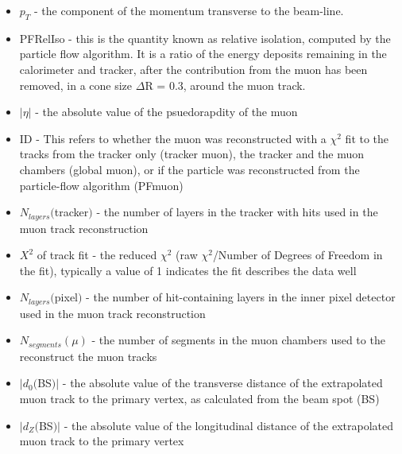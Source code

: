 \begin{itemize}
  \item $p_{T}$ - the component of the momentum transverse to the
    beam-line.
  \item PFRelIso - this is the quantity known as relative isolation,
     computed by the particle flow algorithm.  It is a ratio of the
     energy deposits remaining in the calorimeter and tracker, after
     the contribution from the muon has been removed, in a cone size
     $\Delta$R = 0.3, around the muon track.
  \item $|\eta|$ - the absolute value of the psuedorapdity of the muon
  \item ID - This refers to whether the muon was reconstructed with a
    $\chi^{2}$ fit to the tracks from the tracker only (tracker muon),
    the tracker and the muon chambers (global muon), or if the
    particle was reconstructed from the particle-flow algorithm
    (PFmuon)
  \item $N_{layers}($tracker$)$ - the number of layers in the tracker
    with hits used in the muon track reconstruction
  \item ${X}^{2}$ of track fit - the reduced $\chi^{2}$ (raw
    $\chi^{2}$/Number of Degrees of Freedom in the fit), typically a
    value of 1 indicates the fit describes the data well 
  \item $N_{layers}($pixel$)$ - the number of hit-containing layers in the inner
    pixel detector used in the muon track reconstruction
  \item $N_{segments}(\mu)$ - the number of segments in the muon
    chambers used to the reconstruct the muon tracks
  \item $|d_{0}($BS$)|$ - the absolute value of the transverse distance
    of the extrapolated muon track to the primary vertex, as
    calculated from the beam spot (BS)
  \item $|d_{Z}($BS$)|$ - the absolute value of the longitudinal distance
    of the extrapolated muon track to the primary vertex
\end{itemize}

